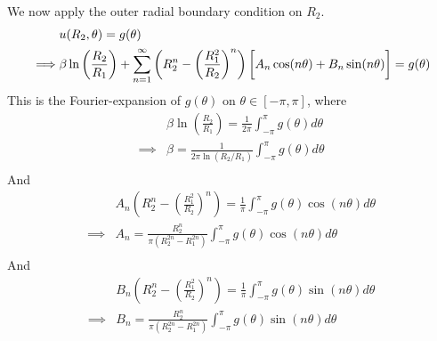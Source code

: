 \documentclass[12pt]{article}
\begin{document}
{We now apply the outer radial boundary condition on $R_2$.
\begin{align*}
& u(R_2, \theta) = g(\theta) \\
\implies& \beta \ln \left( \frac{R_2}{R_1} \right) + \sum_{n=1}^{\infty} \left( R_2^n - \left( \frac{R_1^2}{R_2} \right)^n \right) \left[ \vphantom{\frac{1}{1}}   A_n \cos(n\theta) + B_n \sin(n\theta) \right] = g(\theta) \\
\end{align*}
This is the Fourier-expansion of $g(\theta)$ on $\theta \in [-\pi, \pi]$, where
\begin{align*}
& \beta \ln \left( \frac{R_2}{R_1} \right) = \frac{1}{2\pi} \int_{-\pi}^{\pi} g(\theta) d\theta \\
\implies& \boxed{\beta = \frac{1}{2\pi \ln(R_2 / R_1)} \int_{-\pi}^{\pi} g(\theta) d\theta} \\
\end{align*}
And
\begin{align*}
& A_n \left( R_2^n - \left( \frac{R_1^2}{R_2} \right)^n  \right) = \frac{1}{\pi} \int_{-\pi}^{\pi} g(\theta) \cos(n\theta) d\theta \\
\implies& \boxed{A_n = \frac{R_2^n}{\pi (R_2^{2n} - R_1^{2n}) } \int_{-\pi}^{\pi} g(\theta) \cos(n\theta) d\theta} \\
\end{align*}
And
\begin{align*}
& B_n \left( R_2^n - \left( \frac{R_1^2}{R_2} \right)^n  \right) = \frac{1}{\pi} \int_{-\pi}^{\pi} g(\theta) \sin(n\theta) d\theta \\
\implies& \boxed{B_n = \frac{R_2^n}{\pi (R_2^{2n} - R_1^{2n}) } \int_{-\pi}^{\pi} g(\theta) \sin(n\theta) d\theta} \\
\end{align*}
}
\end{document}
